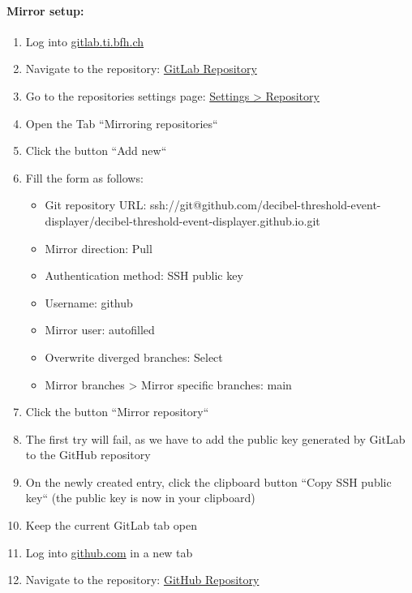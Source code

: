 \paragraph{Mirror setup:}
\begin{enumerate}
    \item Log into \href{https://gitlab.ti.bfh.ch}{gitlab.ti.bfh.ch}
    \item Navigate to the repository: \href{https://gitlab.ti.bfh.ch/decibel-threshold-event-displayer/decibel-threshold-event-displayer/}{GitLab Repository}
    \item Go to the repositories settings page: \href{https://gitlab.ti.bfh.ch/decibel-threshold-event-displayer/decibel-threshold-event-displayer/-/settings/repository}{Settings > Repository}
    \item Open the Tab ``Mirroring repositories``
    \item Click the button ``Add new``
    \item Fill the form as follows:
          \begin{itemize}
              \item Git repository URL: ssh://git@github.com/decibel-threshold-event-displayer/decibel-threshold-event-displayer.github.io.git
              \item Mirror direction: Pull
              \item Authentication method: SSH public key
              \item Username: github
              \item Mirror user: autofilled
              \item Overwrite diverged branches: Select
              \item Mirror branches > Mirror specific branches: main
          \end{itemize}
    \item Click the button ``Mirror repository``
    \item The first try will fail, as we have to add the public key generated by GitLab to the GitHub repository
    \item On the newly created entry, click the clipboard button ``Copy SSH public key`` (the public key is now in your clipboard)
    \item Keep the current GitLab tab open
    \item Log into \href{https://github.com/}{github.com} in a new tab
    \item Navigate to the repository: \href{https://github.com/decibel-threshold-event-displayer/decibel-threshold-event-displayer.github.io/}{GitHub Repository}

\end{enumerate}
